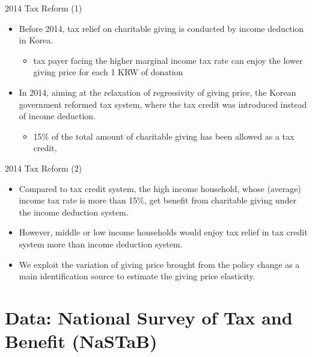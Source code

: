 \documentclass[
  ignorenonframetext,
  aspectratio=169,
]{beamer}
\providecommand{\tightlist}{%
  \setlength{\itemsep}{0pt}\setlength{\parskip}{0pt}}
\begin{document}
\begin{frame}{2014 Tax Reform (1)}
\protect\hypertarget{tax-reform-1}{}
\begin{itemize}
\tightlist
\item
  Before 2014, tax relief on charitable giving is conducted by income deduction in Korea.

  \begin{itemize}
  \tightlist
  \item
    tax payer facing the higher marginal income tax rate can enjoy the lower giving price for each 1 KRW of donation
  \end{itemize}
\item
  In 2014, aiming at the relaxation of regressivity of giving price, the Korean government reformed tax system, where the tax credit was introduced instead of income deduction.

  \begin{itemize}
  \tightlist
  \item
    15\% of the total amount of charitable giving has been allowed as a tax credit,
  \end{itemize}
\end{itemize}
\end{frame}

\begin{frame}{2014 Tax Reform (2)}
\protect\hypertarget{tax-reform-2}{}
\begin{itemize}
\tightlist
\item
  Compared to tax credit system, the high income household, whose (average) income tax rate is more than 15\%,
  get benefit from charitable giving under the income deduction system.
\item
  However, middle or low income households would enjoy tax relief in tax credit system more than income deduction system.
\item
  We exploit the variation of giving price brought from the policy change as a main identification source to estimate the giving price elasticity.
\end{itemize}
\end{frame}

\hypertarget{nastab}{%
\section{Data: National Survey of Tax and Benefit (NaSTaB)}\label{nastab}}
\end{document}
